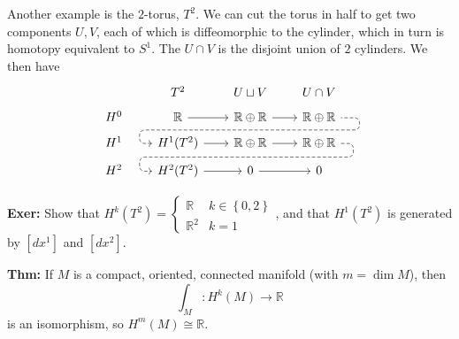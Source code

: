 \documentclass[10pt,letterpaper]{article}
\newcommand{\n}{\hfill\break}
\newcommand{\hangblock}[2]{\par\noindent\settowidth{\hangindent}{\textbf{#1: }}\textbf{#1: }\nolinebreak#2}
\newcommand{\thm}[1]{\hangblock{Thm}{#1}}
\newcommand{\exer}[1]{\hangblock{Exer}{#1}}
\newcommand{\set}[1]{\left\{#1\right\}}
\newcommand{\reals}{\mathbb{R}}
\newcommand{\R}{\reals}
\begin{document}
\par\noindent
Another example is the $2$-torus, $T^{2}$. We can cut the torus in half to get two components $U,V$, each of which is diffeomorphic to the cylinder, which in turn is homotopy equivalent to $S^{1}$. The $U\cap{}V$ is the disjoint union of $2$ cylinders. We then have
\[
	\begin{tikzcd}[column sep=20pt, row sep=tiny]
		& T^{2} & U\sqcup{}V & U\cap{}V\\
		H^{0} & \R \arrow[r] & \R\oplus\R \arrow[r] \arrow[d,phantom,""{coordinate, name=ref1}] & \R\oplus\R\\
		H^{1} & H^{1}(T^{2}) \arrow[r] \arrow[urr, leftarrow, dashed, rounded corners, to path={
			-- ([xshift=-10pt]\tikztostart.west)
			|- (ref1)
			-| ([xshift=15pt]\tikztotarget.east)
			-- (\tikztotarget)
		}] & \R\oplus\R \arrow[r] \arrow[d,phantom,""{coordinate, name=ref2}] & \R\oplus\R \arrow[dll, dashed, rounded corners, to path={
			-- ([xshift=10pt]\tikztostart.east)
			|- (ref2)
			-| ([xshift=-10pt]\tikztotarget.west)
			-- (\tikztotarget)
		}]\\
		H^{2} & H^{2}(T^{2}) \arrow[r] & 0 \arrow[r] & 0
	\end{tikzcd}
\]

\exer{
	Show that $H^{k}(T^{2})=\left\{\begin{array}{ll}
		\R & k\in\set{0,2}\\
		\R^{2} & k=1
	\end{array}\right.$, and that $H^{1}(T^{2})$ is generated by $[dx^{1}]$ and $[dx^{2}]$.\n
}

\thm{
	If $M$ is a compact, oriented, connected manifold (with $m=\dim{}M$), then
	\[
		\int_{M}:H^{k}(M)\to\R
	\]
	is an isomorphism, so $H^{m}(M)\cong\R$.\n
}
\end{document}
